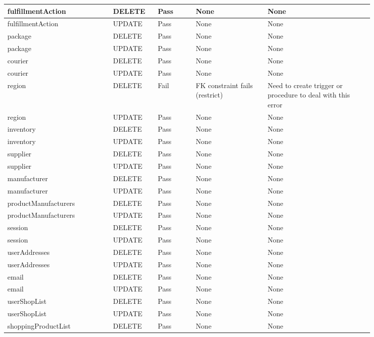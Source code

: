 \begin{spacing}{1.25}
\begin{longtable}{ | p{0.25\linewidth} | p{0.1\linewidth} | p{0.09\linewidth} | p{0.17\linewidth} | p{0.25\linewidth} | }
fulfillmentAction			&	DELETE		&	Pass		&	None							&	None				\\\hline
fulfillmentAction			&	UPDATE		&	Pass		&	None							&	None				\\\hline
package						&	DELETE		&	Pass		&	None							&	None				\\\hline
package						&	UPDATE		&	Pass		&	None							&	None				\\\hline
courier						&	DELETE		&	Pass		&	None							&	None				\\\hline
courier						&	UPDATE		&	Pass		&	None							&	None				\\\hline
region						&	DELETE		&	Fail		&	FK constraint fails (restrict)	&	Need to create trigger or procedure to deal with this error\\\hline
region						&	UPDATE		&	Pass		&	None							&	None				\\\hline
inventory					&	DELETE		&	Pass		&	None							&	None				\\\hline
inventory					&	UPDATE		&	Pass		&	None							&	None				\\\hline
supplier					&	DELETE		&	Pass		&	None							&	None				\\\hline
supplier					&	UPDATE		&	Pass		&	None							&	None				\\\hline
manufacturer				&	DELETE		&	Pass		&	None							&	None				\\\hline
manufacturer				&	UPDATE		&	Pass		&	None							&	None				\\\hline
productManufacturers		&	DELETE		&	Pass		&	None							&	None				\\\hline
productManufacturers		&	UPDATE		&	Pass		&	None							&	None				\\\hline
session						&	DELETE		&	Pass		&	None							&	None				\\\hline
session						&	UPDATE		&	Pass		&	None							&	None				\\\hline
userAddresses				&	DELETE		&	Pass		&	None							&	None				\\\hline
userAddresses				&	UPDATE		&	Pass		&	None							&	None				\\\hline
email						&	DELETE		&	Pass		&	None							&	None				\\\hline
email						&	UPDATE		&	Pass		&	None							&	None				\\\hline
userShopList				&	DELETE		&	Pass		&	None							&	None				\\\hline
userShopList				&	UPDATE		&	Pass		&	None							&	None				\\\hline
shoppingProductList			&	DELETE		&	Pass		&	None							&	None				\\\hline

\end{longtable}
\end{spacing}
